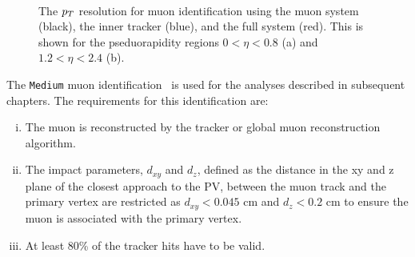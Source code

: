 \begin{figure}[t]
\centering
     \\
\caption{The $p_{T}$ resolution for muon identification using the muon system (black), the inner tracker (blue), and the full system (red). This is shown for the pseduorapidity regions $0 < \eta < 0.8$ (a) and  $1.2 < \eta < 2.4$ (b).}
\label{fig:muon_eff}
\end{figure}

The \texttt{Medium} muon identification~\cite{CMS:2018rym} is used for the analyses described in subsequent chapters.
The requirements for this identification are:
\begin{enumerate}[i)]
\item The muon is reconstructed by the tracker or global muon reconstruction algorithm.
\item The impact parameters, $d_{xy}$ and $d_{z}$, defined as the distance in the xy and z plane of the closest approach to the \ac{PV}, between the muon track and the primary vertex are restricted as $d_{xy}<0.045$ cm and $d_{z}<0.2$ cm to ensure the muon is associated with the primary vertex.
\item At least 80\% of the tracker hits have to be valid.
\end{enumerate}

